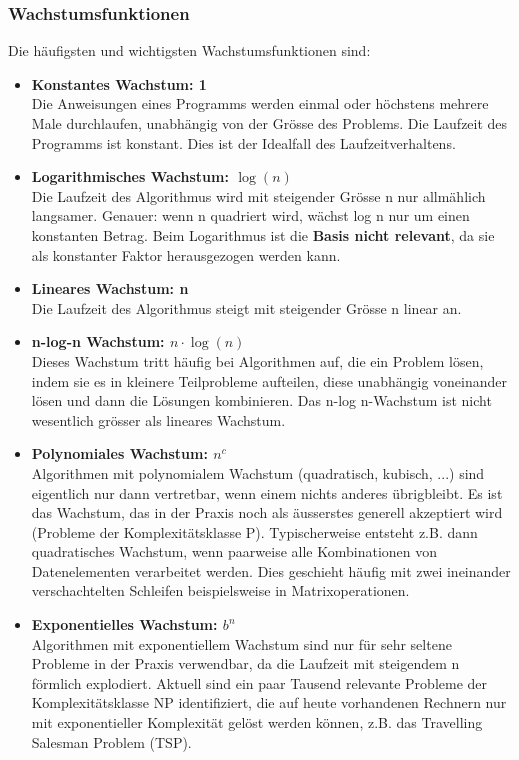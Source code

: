 \subsubsection{Wachstumsfunktionen}
Die häufigsten und wichtigsten Wachstumsfunktionen sind:
\begin{itemize}
\item \textbf{Konstantes Wachstum: 1}\\
			Die Anweisungen eines Programms werden einmal oder höchstens mehrere Male durchlaufen, unabhängig von der Grösse des Problems. Die Laufzeit des Programms ist konstant. Dies ist der Idealfall des Laufzeitverhaltens.
\item \textbf{Logarithmisches Wachstum: $\log(n)$}\\
			Die Laufzeit des Algorithmus wird mit steigender Grösse n nur allmählich langsamer. Genauer: wenn n quadriert wird, wächst log n nur um einen konstanten Betrag. Beim Logarithmus ist die \textbf{Basis nicht relevant}, da sie als konstanter Faktor herausgezogen werden kann.
\item \textbf{Lineares Wachstum: n}\\
			Die Laufzeit des Algorithmus steigt mit steigender Grösse n linear an.
\item \textbf{n-log-n Wachstum: $n\cdot \log(n)$}\\
			Dieses Wachstum tritt häufig bei Algorithmen auf, die ein Problem lösen, indem sie es in kleinere Teilprobleme aufteilen, diese unabhängig voneinander lösen und dann die Lösungen kombinieren. Das n-log n-Wachstum ist nicht wesentlich grösser als lineares Wachstum. 
\item \textbf{Polynomiales Wachstum: $n^c$}\\
			Algorithmen mit polynomialem Wachstum (quadratisch, kubisch, ...) sind eigentlich nur dann vertretbar, wenn einem nichts anderes übrigbleibt. Es ist das Wachstum, das in der Praxis noch als äusserstes generell akzeptiert wird (Probleme der Komplexitätsklasse P). Typischerweise entsteht z.B. dann quadratisches Wachstum, wenn paarweise alle Kombinationen von Datenelementen verarbeitet werden. Dies geschieht häufig mit zwei ineinander verschachtelten Schleifen beispielsweise in Matrixoperationen.  
\item \textbf{Exponentielles Wachstum: $b^n$}\\
			Algorithmen mit exponentiellem Wachstum sind nur für sehr seltene Probleme in der Praxis verwendbar, da die Laufzeit mit steigendem n förmlich explodiert. Aktuell sind ein paar Tausend relevante Probleme der Komplexitätsklasse NP identifiziert, die auf heute vorhandenen Rechnern nur mit exponentieller Komplexität gelöst werden können, z.B. das Travelling Salesman Problem (TSP). 
\end{itemize}
